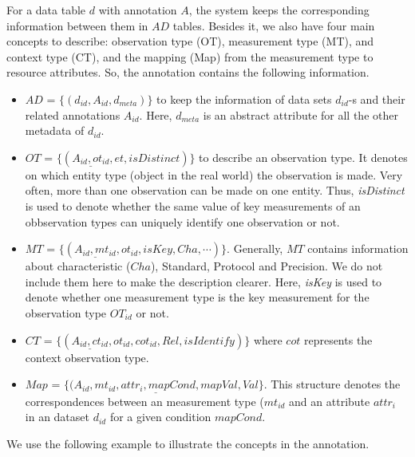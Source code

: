 For a data table $d$ with annotation $A$, the system keeps the
corresponding information between them in $AD$ tables. 
Besides it, we also have four main concepts to describe: 
observation type (OT), measurement type (MT), and
context type (CT), and the mapping (Map) from the measurement type to
resource attributes.  
So, the annotation contains the following information. 

\begin{itemize}
\item $AD$ = $\{(d_{id}, A_{id}, d_{meta})\}$ to keep the information
  of data sets $d_{id}$-s and their related annotations
  $A_{id}$. Here, $d_{meta}$ is an abstract attribute for all the
  other metadata of $d_{id}$. 
\item $OT$ = $\{(\underline{A_{id},ot_{id}}, et, isDistinct)\}$ to
  describe an observation type. It denotes on which
  entity type (object in the real world) the observation is made. 
Very often, more than one observation can be made on one entity. Thus,{\em
  isDistinct} is used to denote whether the same value of key
measurements of an obbservation types can uniquely identify one
observation or not. 
\item $MT$ = $\{(\underline{A_{id}, mt_{id}}, ot_{id},isKey,
  Cha, \cdots)\}$. Generally, $MT$ contains information about
  characteristic ($Cha$), Standard, Protocol and Precision. We do not include them
  here to make the description clearer. Here, {\em isKey} is used to denote
  whether one measurement type is the key measurement for the
  observation type $OT_{id}$ or not. 
\item $CT$ = $\{(\underline{A_{id}, ct_{id}}, ot_{id}, cot_{id}, Rel,
  isIdentify)\}$ where $cot$ represents the context observation
  type. 
\item $Map$ = $\{(\underline{A_{id},mt_{id}, attr_i, mapCond, mapVal},
  Val\}$. This structure denotes the correspondences between an
  measurement type ($mt_{id}$ and an attribute $attr_i$ in an dataset
  $d_{id}$ for a given condition $mapCond$. 
\end{itemize}

We use the following example to illustrate the concepts in the
annotation. 



